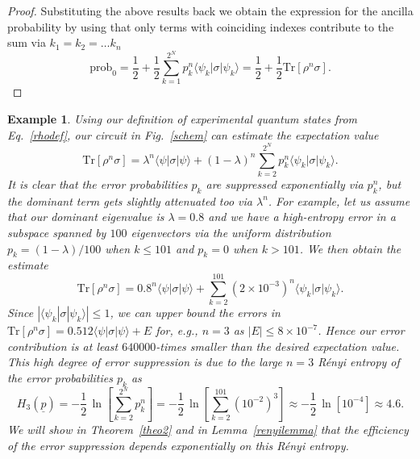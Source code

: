 \documentclass[aps,prx,showpacs,twocolumn,reprint]{revtex4-2}
\newtheorem{example}{Example}
\newcommand{\tr}{\mathrm{Tr}}
\begin{document}
{\begin{proof}
	Substituting the above results back we obtain the expression for
	the ancilla probability by using that only terms with coinciding indexes contribute to the sum via $k_1 = k_2 =\dots k_n$
	\begin{equation}
	\mathrm{prob}_0 = \frac{1}{2} + \frac{1}{2} \sum_{k=1}^{2^N} p_{k}^n \langle\psi_{k} |\sigma| \psi_{k} \rangle
	=\frac{1}{2} + \frac{1}{2}  \tr[\rho^n \sigma].
	\end{equation}
	

\end{proof}





\begin{example} \label{example1}
	\normalfont
	Using our definition of
	experimental quantum states from Eq.~\eqref{rhodef}, our circuit in
	Fig.~\ref{schem} can estimate the expectation value
	\begin{equation*}
	\tr[\rho^n \sigma] = \lambda^n \langle\psi |\sigma | \psi \rangle
	+  (1-\lambda)^n\sum_{k=2}^{2^N} p_k^n  \langle\psi_k |\sigma | \psi_k \rangle.
	\end{equation*}
	It is clear that the error probabilities $p_k$ are suppressed exponentially
	via $p_k^n$, but the dominant term gets slightly attenuated too via $\lambda^n$.
	For example, let us assume that our dominant eigenvalue is $\lambda=0.8$ and we have
	a high-entropy error in a subspace spanned by $100$ eigenvectors
	via the uniform distribution $p_k=(1-\lambda)/100$ when $k\leq101$ and $p_k = 0$
	when $k>101$. We then obtain the estimate
	\begin{equation*}
	\tr[\rho^n \sigma] = 0.8^n \langle\psi |\sigma | \psi \rangle
	+  \sum_{k=2}^{101} (2 \times 10^{-3})^n  \langle\psi_k |\sigma | \psi_k \rangle.
	\end{equation*}
	Since $|\langle\psi_k |\sigma | \psi_k \rangle| \leq 1 $, we can upper bound 
	the errors in $\tr[\rho^n \sigma] = 0.512 \langle\psi |\sigma | \psi \rangle + E$
	for, e.g., $n=3$ as $|E|\leq 8 \times 10^{-7}$. Hence our error contribution is at least $640000$-times
	smaller than the desired expectation value. This high degree of error suppression
	is due to the large $n=3$ R{\'e}nyi entropy of the error probabilities $p_k$ as 
	$$H_3(\underline{p}) = - \frac{1}{2} \, \ln [\sum_{k=2}^{2^N} p^n_k  ] = - \frac{1}{2} \, \ln [\sum_{k=2}^{101} (10^{-2})^3  ]
	\approx - \frac{1}{	2} \, \ln [ 10^{-4} ] \approx 4.6.$$
	We will show in Theorem~\ref{theo2} and in Lemma~\ref{renyilemma} that
	the efficiency of the error suppression depends exponentially on this R{\'e}nyi entropy.
	

\end{example}}
\end{document}
